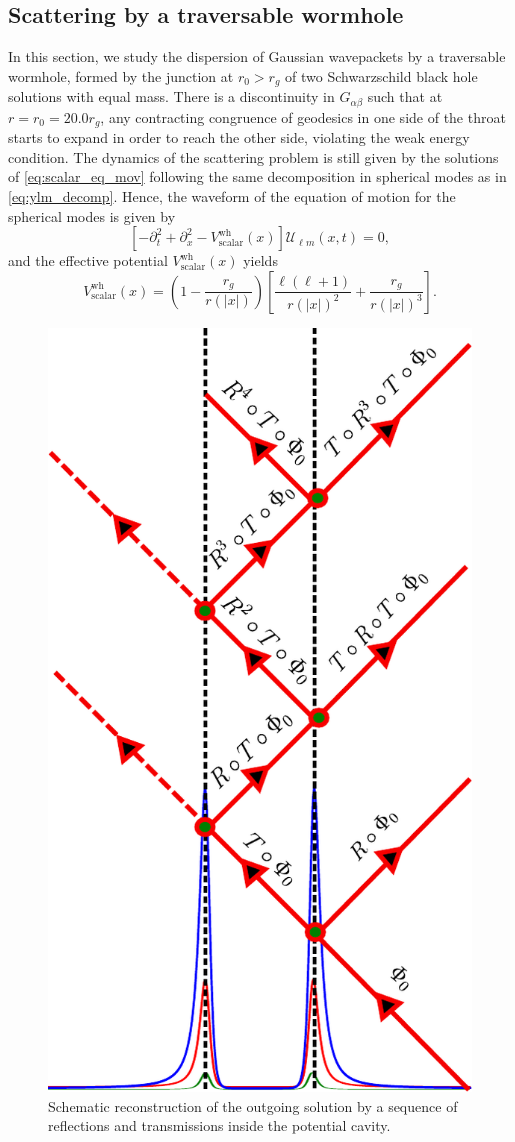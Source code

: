 \documentclass[article,aps,nofootinbib,twocolumn,superscriptaddress]{revtex4-1}
\begin{document}
\subsection{Scattering by a traversable wormhole} 
In this section, we study the dispersion of Gaussian wavepackets by a traversable wormhole, formed by the junction at $r_0>r_g$ of two Schwarzschild black hole solutions with equal mass. There is a discontinuity in $G_{\alpha\beta}$ such that at $r=r_0=20.0r_g$, any contracting congruence of geodesics in one side of the throat starts to expand in order to reach the other side, violating the weak energy condition.
The dynamics of the scattering problem is still given by the solutions of \eqref{eq:scalar_eq_mov} following the same decomposition in spherical modes as in \eqref{eq:ylm_decomp}. Hence, the waveform of the equation of motion for the spherical modes is given by
\begin{equation}
\left[-\partial_t^2+\partial_x^2-V^{\mathrm{wh}}_{\mathrm{scalar}}(x)\right]\mathcal{U}_{\ell m}(x,t) = 0,
\label{eq:wave_scalar_wh}
\end{equation}
and the effective potential $V^{\mathrm{wh}}_{\mathrm{scalar}}(x)$ yields
\begin{equation}
V^{\mathrm{wh}}_{\mathrm{scalar}}\left(x\right) = \left(1-\frac{r_g}{r\left(|x|\right)}\right)\left[\frac{\ell(\ell+1)}{r\left(|x|\right)^2}+\frac{r_g}{r\left(|x|\right)^3}\right].
\end{equation}   
\begin{figure}[t!]
\centering
\includegraphics[width=.3\textwidth]{figures/Geom_optics.pdf}
\caption{\label{fig:Geom_optics} Schematic reconstruction of the outgoing solution by a sequence of reflections and transmissions inside the potential cavity.}
\end{figure}
\end{document}
